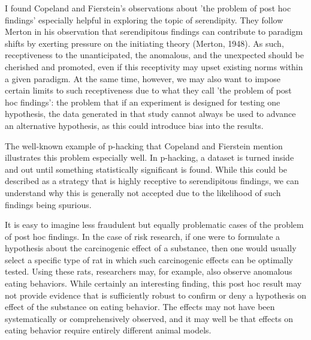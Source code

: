 \documentclass[authordate, commentary]{jote-new-article}
\begin{document}

	I found Copeland and Fierstein's observations about 'the problem of post hoc findings' especially helpful in exploring the topic of serendipity. They follow Merton in his observation that serendipitous findings can contribute to paradigm shifts by exerting pressure on the initiating theory (Merton, 1948). As such, receptiveness to the unanticipated, the anomalous, and the unexpected should be cherished and promoted, even if this receptivity may upset existing norms within a given paradigm. At the same time, however, we may also want to impose certain limits to such receptiveness due to what they call 'the problem of post hoc findings': the problem that if an experiment is designed for testing one hypothesis, the data generated in that study cannot always be used to advance an alternative hypothesis, as this could introduce bias into the results.



	The well-known example of p-hacking that Copeland and Fierstein mention illustrates this problem especially well. In p-hacking, a dataset is turned inside and out until something statistically significant is found. While this could be described as a strategy that is highly receptive to serendipitous findings, we can understand why this is generally not accepted due to the likelihood of such findings being spurious.



	It is easy to imagine less fraudulent but equally problematic cases of the problem of post hoc findings. In the case of risk research, if one were to formulate a hypothesis about the carcinogenic effect of a substance, then one would usually select a specific type of rat in which such carcinogenic effects can be optimally tested. Using these rats, researchers may, for example, also observe anomalous eating behaviors. While certainly an interesting finding, this post hoc result may not provide evidence that is sufficiently robust to confirm or deny a hypothesis on effect of the substance on eating behavior. The effects may not have been systematically or comprehensively observed, and it may well be that effects on eating behavior require entirely different animal models.
\end{document}
